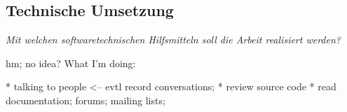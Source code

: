\documentclass[pdftex,a4paper,11pt]{scrartcl}
\begin{document}
\begin{comment}
\begin{itemize}
	\item Eine wesentliche Grundlage der wissenschaftlichen Arbeit, ist die systematische Anwendung einer Forschungsmethode. Die erlaubt Ihnen ein systematisches Vorgehen bei Ihrer Masterarbeit.
	\item Am HCC.lab werden Arbeiten in den folgenden Bereichen geschrieben:
	       \begin{itemize}
				\item Information Retrieval
				\item Recommender Systeme
				\item Data/Community Analytics <--- me?
				\item Information Visualization
				\item Interaction Design
			\end{itemize}
	\item Sie sollten in der Lage sein, Ihre Arbeit in einen dieser Bereiche einzuordnen. Falls Sie Probleme dabei haben, wenden Sie sich bitte an Ihre/n Betreuer/in.
	\item Für die Auswahl der geeigneten Forschungsmethode verweise ich Sie auf zwei Bücher hin, die eine Zusammenstellung der verfügbaren Methoden und ihre praktischen Anwendung im Bereich Human-Computer Interaction diskutieren \cite{olson2014ways}, \cite{lazar2010research}. Beide Bücher sind bei Frau Prof. Müller-Birn verfügbar. Einzelne Artikel könnten Ihnen auch in einer elektronischen Version zur Verfügung gestellt werden.
\end{itemize}
\end{comment}

\subsection{Technische Umsetzung}
\noindent \emph{Mit welchen softwaretechnischen Hilfsmitteln soll die Arbeit realisiert werden?}
\begin{comment}
\begin{itemize}
	\item Selbstverständlich können Sie an der Stelle noch nicht alles wissen, aber Sie sollen sich hier bereits einen guten Überblick verschaffen.
\end{itemize}
\end{comment}

hm; no idea?
What I'm doing:

* talking to people <-- evtl record conversations;
* review source code
* read documentation; forums; mailing lists;
\end{document}
